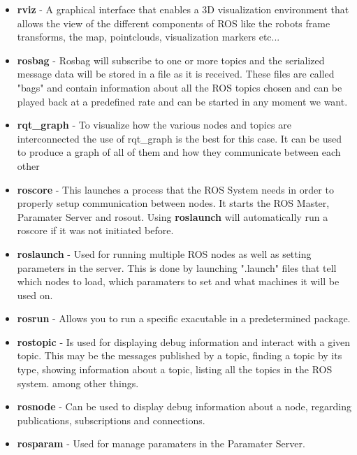 \begin{itemize}
    \item \textbf{rviz} - A graphical interface that enables a 3D visualization environment that allows the view of the different components of \ac{ROS} like the robots frame transforms, the map, pointclouds, visualization markers etc...
    \item \textbf{rosbag} - Rosbag will subscribe to one or more topics and the serialized message data will be stored in a file as it is received. These files are called "bags" and contain information about all the \ac{ROS} topics chosen and can be played back at a predefined rate and can be started in any moment we want. 
    \item \textbf{rqt_graph} - To visualize how the various nodes and topics are interconnected the use of rqt\_graph is the best for this case. It can be used to produce a graph of all of them and how they communicate between each other

    \item \textbf{roscore} - This launches a process that the ROS System needs in order to properly setup communication between nodes. It starts the \ac{ROS} Master, Paramater Server and rosout. Using \textbf{roslaunch} will automatically run a roscore if it was not initiated before. 
    \item \textbf{roslaunch} - Used for running multiple ROS nodes as well as setting parameters in the server. This is done by launching ".launch" files that tell which nodes to load, which paramaters to set and what machines it will be used on.
    \item \textbf{rosrun} - Allows you to run a specific exacutable in a predetermined package.

    \item \textbf{rostopic} - Is used for displaying debug information and interact with a given topic. This may be the messages published by a topic, finding a topic by its type, showing information about a topic, listing all the topics in the \ac{ROS} system. among other things.
    \item \textbf{rosnode} - Can be used to display debug information about a node, regarding publications, subscriptions and connections.
    \item \textbf{rosparam} - Used for manage paramaters in the Paramater Server.

\end{itemize}

